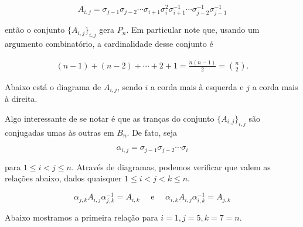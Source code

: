 	\begin{equation*}
	\tag{Geradores de Artin}
	\label{geradores de Artin}
	A_{i,j} = \sigma_{j-1}\sigma_{j-2}\cdots\sigma_{i+1}\sigma_i^2\sigma_{i+1}^{-1}\cdots\sigma_{j-2}^{-1}\sigma_{j-1}^{-1} 
	\end{equation*}
	
	\vspace{0.3cm} então o conjunto $\{ A_{i,j} \}_{i,j}$ gera $P_n$. Em particular note que, usando um argumento combinatório, a cardinalidade desse conjunto é
	
	\begin{align*}
	(n-1) + (n-2) + \cdots + 2 + 1 = \frac{n(n-1)}{2} = \binom{n}{2}.
	\end{align*}
	
	\par\vspace{0.3cm} Abaixo está o diagrama de $A_{i,j}$, sendo $i$ a corda mais à esquerda e $j$ a corda mais à direita.
	\begin{center}
	\end{center}
	
	\par\vspace{0.3cm} Algo interessante de se notar é que as tranças do conjunto $\{A_{i,j}\}_{i,j}$ são conjugadas umas às outras em $B_n$. De fato, seja
	
	$$\alpha_{i,j} = \sigma_{j-1}\sigma_{j-2}\cdots\sigma_i$$
	
	\vspace{0.3cm} para $1\leq i<j\leq n$. Através de diagramas, podemos verificar que valem as relações abaixo, dados quaisquer $1\leq i<j<k\leq n$.
	
	\begin{equation*}
	\alpha_{j,k}A_{i,j}\alpha_{j,k}^{-1} = A_{i,k} \quad\text{ e }\quad \alpha_{i,k}A_{i,j}\alpha_{i,k}^{-1} = A_{j,k}
	\end{equation*}
	
	\par\vspace{0.3cm} Abaixo mostramos a primeira relação para $i=1, j=5, k=7=n$.
	\begin{center}
	\end{center}
	
